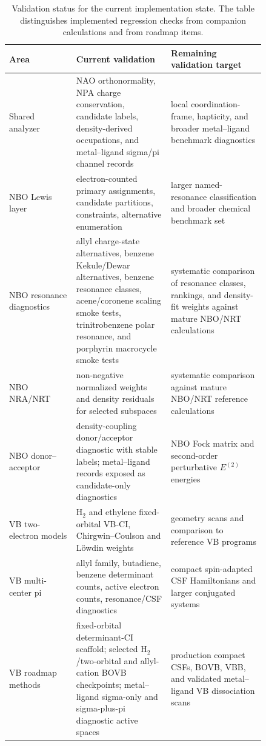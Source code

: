 \documentclass[11pt]{article}
\begin{document}
\begin{table}[htbp]
\centering
\caption{Validation status for the current implementation state.  The table distinguishes implemented regression checks from companion calculations and from roadmap items.}
\label{tab:validation-status}
\begin{tabular}{p{0.22\linewidth}p{0.31\linewidth}p{0.31\linewidth}}
\toprule
Area & Current validation & Remaining validation target \\
\midrule
Shared analyzer & NAO orthonormality, NPA charge conservation, candidate labels, density-derived occupations, and metal--ligand sigma/pi channel records & local coordination-frame, hapticity, and broader metal--ligand benchmark diagnostics \\
NBO Lewis layer & electron-counted primary assignments, candidate partitions, constraints, alternative enumeration & larger named-resonance classification and broader chemical benchmark set \\
NBO resonance diagnostics & allyl charge-state alternatives, benzene Kekule/Dewar alternatives, benzene resonance classes, acene/coronene scaling smoke tests, trinitrobenzene polar resonance, and porphyrin macrocycle smoke tests & systematic comparison of resonance classes, rankings, and density-fit weights against mature NBO/NRT calculations \\
NBO NRA/NRT & non-negative normalized weights and density residuals for selected subspaces & systematic comparison against mature NBO/NRT reference calculations \\
NBO donor--acceptor & density-coupling donor/acceptor diagnostic with stable labels; metal--ligand records exposed as candidate-only diagnostics & NBO Fock matrix and second-order perturbative $E^{(2)}$ energies \\
VB two-electron models & H$_2$ and ethylene fixed-orbital VB-CI, Chirgwin--Coulson and L\"owdin weights & geometry scans and comparison to reference VB programs \\
VB multi-center pi & allyl family, butadiene, benzene determinant counts, active electron counts, resonance/CSF diagnostics & compact spin-adapted CSF Hamiltonians and larger conjugated systems \\
VB roadmap methods & fixed-orbital determinant-CI scaffold; selected H$_2$/two-orbital and allyl-cation BOVB checkpoints; metal--ligand sigma-only and sigma-plus-pi diagnostic active spaces & production compact CSFs, BOVB, VBB, and validated metal--ligand VB dissociation scans \\
\bottomrule
\end{tabular}
\end{table}
\end{document}
